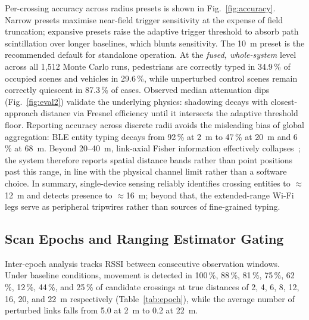 \documentclass[journal,10pt]{IEEEtran}
\begin{document}
Per-crossing accuracy across radius presets is shown in
Fig.~\ref{fig:accuracy}. Narrow presets maximise near-field trigger
sensitivity at the expense of field truncation; expansive presets raise the
adaptive trigger threshold to absorb path scintillation over longer
baselines, which blunts sensitivity. The 10~m preset is the recommended
default for standalone operation. At the \emph{fused, whole-system} level
across all 1,512 Monte Carlo runs, pedestrians are correctly typed in
34.9\,\% of occupied scenes and vehicles in 29.6\,\%, while unperturbed
control scenes remain correctly quiescent in 87.3\,\% of cases. Observed
median attenuation dips (Fig.~\ref{fig:eval2}) validate the underlying
physics: shadowing decays with closest-approach distance via Fresnel
efficiency until it intersects the adaptive threshold floor. Reporting
accuracy across discrete radii avoids the misleading bias of global
aggregation: BLE entity typing decays from 92\,\% at 2~m to 47\,\% at 20~m
and 6\,\% at 68~m. Beyond 20--40~m, link-axial Fisher information effectively
collapses~\cite{li2024}; the system therefore reports spatial distance bands
rather than point positions past this range, in line with the physical
channel limit rather than a software choice. In summary, single-device
sensing reliably identifies crossing entities to $\approx$12~m and detects
presence to $\approx$16~m; beyond that, the extended-range Wi-Fi legs serve
as peripheral tripwires rather than sources of fine-grained typing.

\subsection{Scan Epochs and Ranging Estimator Gating}
Inter-epoch analysis tracks RSSI between consecutive observation windows.
Under baseline conditions, movement is detected in 100\,\%, 88\,\%, 81\,\%,
75\,\%, 62\,\%, 12\,\%, 44\,\%, and 25\,\% of candidate crossings at true
distances of 2, 4, 6, 8, 12, 16, 20, and 22~m respectively
(Table~\ref{tab:epoch}), while the average number of perturbed links falls
from 5.0 at 2~m to 0.2 at 22~m.
\end{document}

